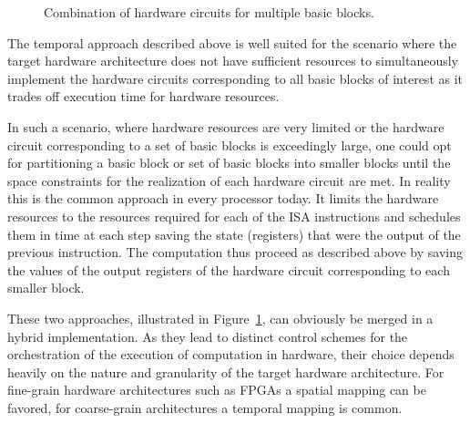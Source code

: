 \begin{figure}[htbp]
  \centering

\caption{Combination of hardware circuits for multiple basic blocks.}
\label{fig:Fig.4.4}
\end{figure}

The temporal approach described above is well suited for the scenario where the target hardware architecture does not have sufficient resources to simultaneously implement the hardware circuits corresponding to all basic blocks of interest as it trades off execution time for hardware resources.

In such a scenario, where hardware resources are very limited or the hardware circuit corresponding to a set of basic blocks is exceedingly large, one could opt for partitioning a basic block or set of basic blocks into smaller blocks until the space constraints for the realization of each hardware circuit are met. 
In reality this is the common approach in every processor today. 
It limits the hardware resources to the resources required for each of the ISA instructions and schedules them in time at each step saving the state (registers) that were the output of the previous instruction. 
The computation thus proceed as described above by saving the values of the output registers of the hardware circuit corresponding to each smaller block.

These two approaches, illustrated in Figure~\ref{fig:Fig.4.4}, can obviously be merged in a hybrid implementation. 
As they lead to distinct control schemes for the orchestration of the execution of computation in hardware, their choice depends heavily on the nature and granularity of the target hardware architecture. 
For fine-grain hardware architectures such as FPGAs a spatial mapping can be favored, for coarse-grain architectures a temporal mapping is common.

